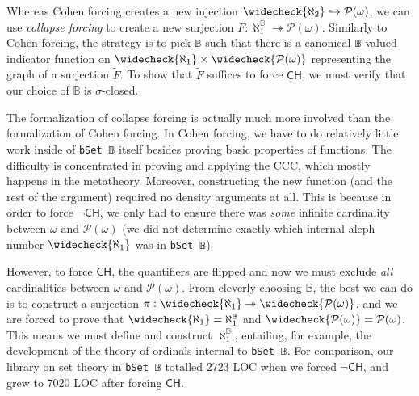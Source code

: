\documentclass[sigplan,screen]{acmart}
\newcommand{\lil}{\lstinline}
\newcommand{\CH}{\mathsf{CH}}
\theoremstyle{definition}
\begin{document}
Whereas Cohen forcing creates a new injection \(\widecheck{\aleph_2} \hookrightarrow \mathcal{P}(\omega)\), we can use \emph{collapse forcing} to create a new surjection \(F : \aleph_1^{\mathbb{B}} \twoheadrightarrow \mathcal{P}(\omega)\).
Similarly to Cohen forcing, the strategy is to pick \lil{𝔹} such that there is a canonical \lil{𝔹}-valued indicator function on \(\widecheck{\aleph_1} \times \widecheck{\mathcal{P}(\omega)}\) representing the graph of a surjection \(\widetilde{F}\).
To show that \(\widetilde{F}\) suffices to force \(\CH\), we must verify that our choice of \(\mathbb{B}\) is \(\sigma\)-closed.
%

The formalization of collapse forcing is actually much more involved than the formalization of Cohen forcing. In Cohen forcing, we have to do relatively little work inside of \lil{bSet 𝔹} itself besides proving basic properties of functions. The difficulty is concentrated in proving and applying the CCC, which mostly happens in the metatheory. Moreover, constructing the new function (and the rest of the argument) required no density arguments at all. This is because in order to force \(\neg \CH\), we only had to ensure there was \emph{some} infinite cardinality between \(\omega\) and \(\mathcal{P}(\omega)\) (we did not determine exactly which internal aleph number \(\widecheck{\aleph_1}\) was in \lil{bSet 𝔹}).

However, to force \(\CH\), the quantifiers are flipped and now we must exclude \emph{all} cardinalities between \(\omega\) and \(\mathcal{P}(\omega)\). From cleverly choosing \(\mathbb{B}\), the best we can do is to construct a surjection \(\pi : \widecheck{\aleph_1} \twoheadrightarrow \widecheck{\mathcal{P}(\omega)}\), and we are forced to prove that \(\widecheck{\aleph_1} = \aleph_1^{\mathbb{B}}\) and \(\widecheck{\mathcal{P}(\omega)} = \mathcal{P}(\omega)\). This means we must define and construct \(\aleph_1^{\mathbb{B}}\), entailing, for example, the development of the theory of ordinals internal to \lstinline{bSet 𝔹}. For comparison, our library on set theory in \lstinline{bSet 𝔹} totalled 2723 LOC when we forced \(\neg \CH\), and grew to 7020 LOC after forcing \(\CH\).

\end{document}
